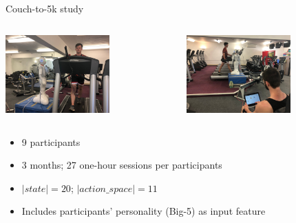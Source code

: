 \documentclass[xcolor=table]{beamer}
\begin{document}
{

\begin{frame}{Couch-to-5k study}

    \vspace{0.2cm}

    \begin{columns}
        \begin{column}{0.5\linewidth}
                \centering
                \includegraphics[height=3cm]{couch25k/hri.jpg}
        \end{column}
        \begin{column}{0.5\linewidth}
                \centering
                \includegraphics[height=3cm]{couch25k/supervised.jpg}
        \end{column}
    \end{columns}

    \begin{itemize}
        \item 9 participants
        \item 3 months; 27 one-hour sessions per participants
        \item $|state| = 20$; $|action\_space| = 11$
        \item Includes participants' personality (Big-5) as input feature
    \end{itemize}

\end{frame}
}
\end{document}
